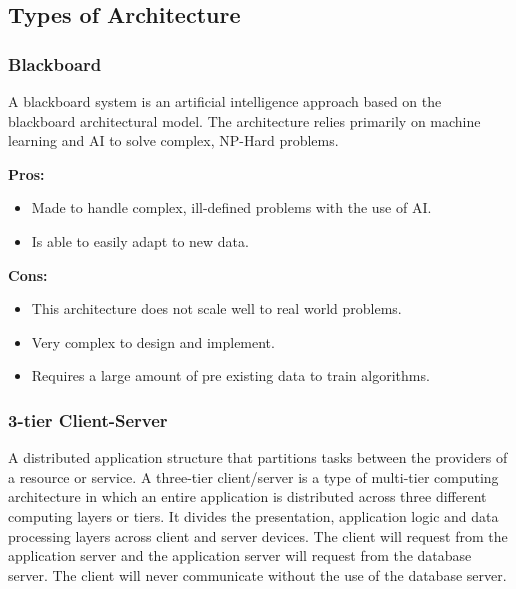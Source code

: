 \documentclass[11pt]{article}
\begin{document}
		\subsection{Types of Architecture}
			\subsubsection{Blackboard}
			\begin{flushleft}
				A blackboard system is an artificial intelligence approach based on the blackboard architectural model. The architecture relies primarily on machine learning and AI to solve complex, NP-Hard problems.
			\end{flushleft}
			
			\textbf{Pros:}
			\begin{itemize}
				\item Made to handle complex, ill-defined problems with the use of AI.
				\item Is able to easily adapt to new data.\\
			\end{itemize}
			
			\textbf{Cons:}
			\begin{itemize}
				\item This architecture does not scale well to real world problems.
				\item Very complex to design and implement.
				\item Requires a large amount of pre existing data to train algorithms.
			\end{itemize}
			
			\subsubsection{3-tier Client-Server}
			
			\begin{flushleft}
				A distributed application structure that partitions tasks between the providers of a resource or service. A three-tier client/server is a type of multi-tier computing architecture in which an entire application is distributed across three different computing layers or tiers. It divides the presentation, application logic and data processing layers across client and server devices. The client will request from the application server and the application server will request from the database server. The client will never communicate without the use of the database server.				
			\end{flushleft}
			
\end{document}
